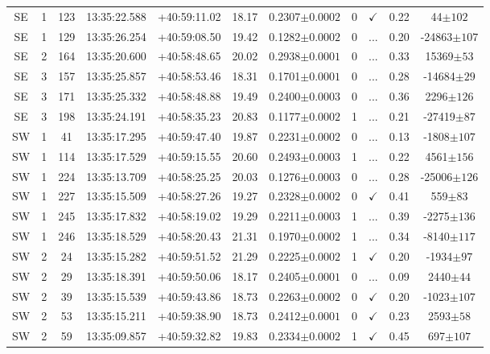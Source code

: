 \begin{table}
\begin{tabular}{ccccccccccc}
		SE & 1 & 123 & 13:35:22.588 & +40:59:11.02 & 18.17 & 0.2307$\pm{0.0002}$ & 0 & $\checkmark$ & 0.22 & 44$\pm{102}$ \\
		SE & 1 & 129 & 13:35:26.254 & +40:59:08.50 & 19.42 & 0.1282$\pm{0.0002}$ & 0 & ... & 0.20 & -24863$\pm{107}$ \\
		SE & 2 & 164 & 13:35:20.600 & +40:58:48.65 & 20.02 & 0.2938$\pm{0.0001}$ & 0 & ... & 0.33 & 15369$\pm{53}$ \\
		SE & 3 & 157 & 13:35:25.857 & +40:58:53.46 & 18.31 & 0.1701$\pm{0.0001}$ & 0 & ... & 0.28 & -14684$\pm{29}$ \\
		SE & 3 & 171 & 13:35:25.332 & +40:58:48.88 & 19.49 & 0.2400$\pm{0.0003}$ & 0 & ... & 0.36 & 2296$\pm{126}$ \\
		SE & 3 & 198 & 13:35:24.191 & +40:58:35.23 & 20.83 & 0.1177$\pm{0.0002}$ & 1 & ... & 0.21 & -27419$\pm{87}$ \\
		SW & 1 & 41 & 13:35:17.295 & +40:59:47.40 & 19.87 & 0.2231$\pm{0.0002}$ & 0 & ... & 0.13 & -1808$\pm{107}$ \\
		SW & 1 & 114 & 13:35:17.529 & +40:59:15.55 & 20.60 & 0.2493$\pm{0.0003}$ & 1 & ... & 0.22 & 4561$\pm{156}$ \\
		SW & 1 & 224 & 13:35:13.709 & +40:58:25.25 & 20.03 & 0.1276$\pm{0.0003}$ & 0 & ... & 0.28 & -25006$\pm{126}$ \\
		SW & 1 & 227 & 13:35:15.509 & +40:58:27.26 & 19.27 & 0.2328$\pm{0.0002}$ & 0 & $\checkmark$ & 0.41 & 559$\pm{83}$ \\
		SW & 1 & 245 & 13:35:17.832 & +40:58:19.02 & 19.29 & 0.2211$\pm{0.0003}$ & 1 & ... & 0.39 & -2275$\pm{136}$ \\
		SW & 1 & 246 & 13:35:18.529 & +40:58:20.43 & 21.31 & 0.1970$\pm{0.0002}$ & 1 & ... & 0.34 & -8140$\pm{117}$ \\
		SW & 2 & 24 & 13:35:15.282 & +40:59:51.52 & 21.29 & 0.2225$\pm{0.0002}$ & 1 & $\checkmark$ & 0.20 & -1934$\pm{97}$ \\
		SW & 2 & 29 & 13:35:18.391 & +40:59:50.06 & 18.17 & 0.2405$\pm{0.0001}$ & 0 & ... & 0.09 & 2440$\pm{44}$ \\
		SW & 2 & 39 & 13:35:15.539 & +40:59:43.86 & 18.73 & 0.2263$\pm{0.0002}$ & 0 & $\checkmark$ & 0.20 & -1023$\pm{107}$ \\
		SW & 2 & 53 & 13:35:15.211 & +40:59:38.90 & 18.73 & 0.2412$\pm{0.0001}$ & 0 & $\checkmark$ & 0.23 & 2593$\pm{58}$ \\
		SW & 2 & 59 & 13:35:09.857 & +40:59:32.82 & 19.83 & 0.2334$\pm{0.0002}$ & 1 & $\checkmark$ & 0.45 & 697$\pm{107}$ \\

\end{tabular}
\end{table}
